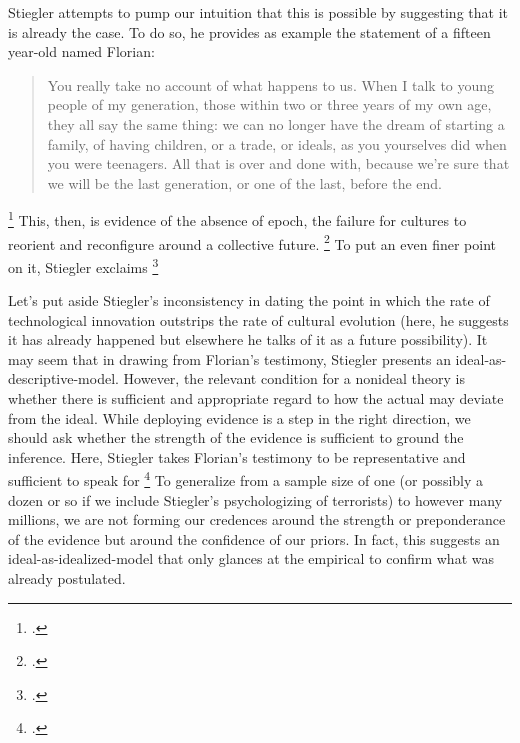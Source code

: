 \documentclass[letterpaper,notitlepage,12pt]{article}
\begin{document}
Stiegler attempts to pump our intuition that this is possible by suggesting that
it is already the case.
To do so, he provides as example the statement of a fifteen year-old named
Florian: \blockquote{You really take no account of what happens to us. When I
  talk to young people of my generation, those within two or three years of my
  own age, they all say the same thing: we can no longer have the dream of
  starting a family, of having children, or a trade, or ideals, as you
  yourselves did when you were teenagers. All that is over and done with,
  because we're sure that we will be the last generation, or one of the last,
before the end.}\footcite[ch. 1.5]{stiegler_age_2019}
This, then, is evidence of the absence of epoch, the failure for cultures to
reorient and reconfigure around a collective future. \footcite[ch. 2.6]{stiegler_age_2019}
To put an even finer point on it, Stiegler exclaims \footcite[ch.
2.6]{stiegler_age_2019}

Let's put aside Stiegler's inconsistency in dating the point in which the rate
of technological innovation outstrips the rate of cultural evolution (here, he
suggests it has already happened but elsewhere he talks of it as a future
possibility). It may seem that in drawing from Florian's testimony, Stiegler
presents an ideal-as-descriptive-model.
However, the relevant condition for a nonideal theory is whether there is
sufficient and appropriate regard to how the actual may deviate from the ideal.
While deploying evidence is a step in the right direction, we should ask whether
the strength of the evidence is sufficient to ground the inference.
Here, Stiegler takes Florian's testimony to be representative and sufficient to
speak for \footcite[ch.
1.5]{stiegler_age_2019}
To generalize from a sample size of one (or possibly a dozen or so if we include
Stiegler's psychologizing of terrorists) to however many millions, we are not
forming our credences around the strength or preponderance of the evidence but
around the confidence of our priors.
In fact, this suggests an ideal-as-idealized-model that only glances at the
empirical to confirm what was already postulated.
\end{document}

